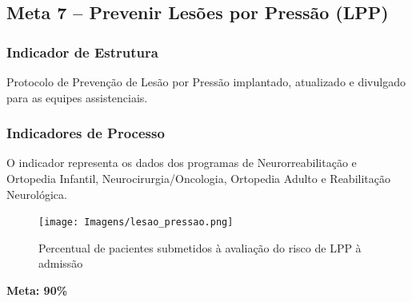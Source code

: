 \documentclass[
  a4paper]{article}
\begin{document}
\begin{table}[H]

\caption{\label{tab:unnamed-chunk-25}Distribuição do número de quedas, demais setores}
\centering
{}
\end{table}

\subsection{Meta 7 – Prevenir Lesões por Pressão (LPP)}

\subsubsection{Indicador de Estrutura}

Protocolo de Prevenção de Lesão por Pressão implantado, atualizado e
divulgado para as equipes assistenciais.

\subsubsection{Indicadores de Processo}

O indicador representa os dados dos programas de Neurorreabilitação e
Ortopedia Infantil, Neurocirurgia/Oncologia, Ortopedia Adulto e
Reabilitação Neurológica.

\begin{figure}[H]
\caption{Percentual de pacientes submetidos à avaliação do risco de LPP à admissão}
\texttt{[image: Imagens/lesao\_pressao.png]}
\end{figure}

\begin{center}
 \textbf{Meta: 90\%}
\end{center}
\end{document}
